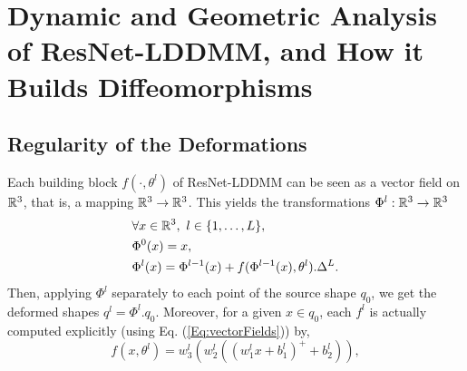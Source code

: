 \section{Dynamic and Geometric Analysis of ResNet-LDDMM, and How it Builds Diffeomorphisms}
\label{sec:Diffeos}

\subsection{Regularity of the Deformations}
Each building block $f(\cdot,\theta^l)$ of ResNet-LDDMM can be seen as a vector field on $\mathbb{R}^3$, that is, a mapping $\mathbb{R}^3\rightarrow\mathbb{R}^3$. This yields the transformations $\Phi^l:\mathbb{R}^3\rightarrow\mathbb{R}^3$
\begin{equation} \label{Eq:discreteDiffeo}
\begin{split}
&\forall x\in\mathbb{R}^3,\ l\in \{1,\dots,L\},\\ &\Phi^0(x)=x, \\&\Phi^l(x)=\Phi^{l-1}(x)+ f(\Phi^{l-1}(x),\theta^l).\Delta^L.
\end{split}
\end{equation}
Then, applying $\Phi^l$ separately to each point of the source shape $q_0$, we get the deformed shapes $q^l=\Phi^l.q_0$. Moreover, for a given $x\in q_0$, each $f^l$ is actually computed explicitly (using Eq. (\ref{Eq:vectorFields})) by,
\begin{equation} \label{Eq:vectorFields}
f(x,\theta^l) = w_3^l(w_2^l((w_1^l x+b_1^l)^++b_2^l)),
\end{equation}
